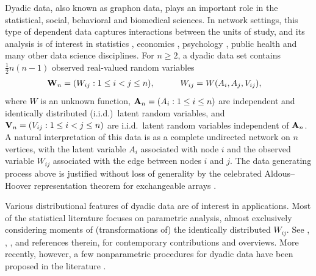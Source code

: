 Dyadic data, also known as graphon data, plays an important role in the
statistical, social, behavioral and biomedical sciences. In network settings,
this type of dependent data captures interactions between the units of study,
and its analysis is of interest in statistics \citep{kolaczyk2009statistical},
economics \citep{graham2020network}, psychology \citep{kenny2020dyadic}, public
health \citep{luke2007network} and many other data science disciplines. For
$n \geq 2$, a dyadic data set contains $\frac{1}{2}n(n-1)$ observed real-valued
random variables
%
\begin{align*}
  \mathbf{W}_n = (W_{i j}:1\leq i<j \leq n),
  \quad\qquad W_{i j}
  &= W(A_i,A_j,V_{i j}),
\end{align*}
%
where $W$ is an unknown function, $\mathbf{A}_n=(A_{i}:1\leq i \leq n)$ are
independent and identically distributed (i.i.d.)\ latent random variables, and
$\mathbf{V}_n=(V_{i j}:1\leq i<j \leq n)$ are i.i.d.\ latent random variables
independent of $\mathbf{A}_n$. A natural interpretation of this data is as a complete
undirected network on $n$ vertices, with the latent variable $A_i$ associated
with node $i$ and the observed variable $W_{i j}$ associated with the edge
between nodes $i$ and $j$. The data generating process above is justified
without loss of generality by the celebrated Aldous--Hoover representation
theorem for exchangeable arrays
\citep{aldous1981representations,hoover1979relations}.

Various distributional features of dyadic data are of interest in applications.
Most of the statistical literature focuses on parametric analysis, almost
exclusively considering moments of (transformations of) the identically
distributed $W_{i j}$. See \citet{davezies2021exchangeable},
\citet{gao2021minimax}, \citet{matsushita2021jackknife}, and references
therein, for
contemporary contributions and overviews. More recently, however, a few
nonparametric procedures for dyadic data have been proposed in the literature
\citep{graham2021minimax,graham2022kernel}.

